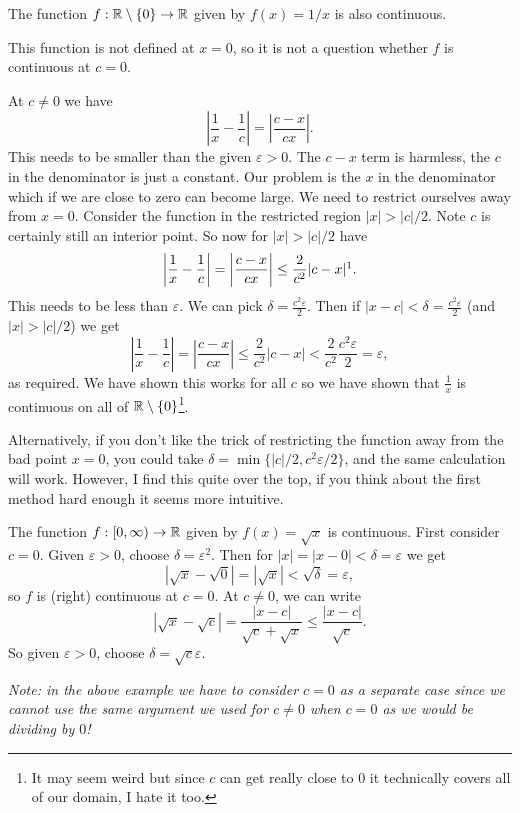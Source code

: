 \documentclass[10pt, a4paper]{article}
\begin{document}
\begin{example}
    The function $f : \mathbb{R} \setminus \{0\} \rightarrow \mathbb{R}$ given by $f(x) = 1 / x$ is also continuous.

    This function is not defined at $x = 0$,
    so it is not a question whether $f$ is continuous at $c = 0$.

    At $c \neq 0$ we have
    \[
    \left|\frac{1}{x} - \frac{1}{c}\right| = \left|\frac{c - x}{cx}\right|.
    \]
    This needs to be smaller than the given $\varepsilon > 0$.
    The $c - x$ term is harmless,
    the $c$ in the denominator is just a constant.
    Our problem is the $x$ in the denominator which if we are close to zero can become large.
    We need to restrict ourselves away from $x = 0$.
    Consider the function in the restricted region $|x| > |c| / 2$.
    Note $c$ is certainly still an interior point.
    So now for $|x| > |c| / 2$ have
    \[
    \left|\frac{1}{x} - \frac{1}{c}\right| = \left|\frac{c - x}{cx}\right| \leq \frac{2}{c ^ 2}|c - x|\footnotemark.
    \]
    This needs to be less than $\varepsilon$.
    We can pick $\delta = \frac{c ^ 2 \varepsilon}{2}$.
    Then if $|x - c| < \delta = \frac{c ^ 2 \varepsilon}{2}$
    (and $|x| > |c| / 2$)
    we get
    \[
    \left|\frac{1}{x} - \frac{1}{c}\right| = \left|\frac{c - x}{cx}\right| \leq \frac{2}{c ^ 2}|c - x| < \frac{2}{c ^ 2}\frac{c ^ 2\varepsilon}{2} = \varepsilon,
    \]
    as required.
    We have shown this works for all $c$ so we have shown that $\frac{1}{x}$ is continuous on all of $\mathbb{R} \setminus \{0\}$\footnote{It may seem weird but since $c$ can get really close to $0$ it technically covers all of our domain,
    I hate it too.}.

    Alternatively,
    if you don't like the trick of restricting the function away from the bad point $x = 0$,
    you could take $\delta = \min\{|c| / 2, c ^ 2\varepsilon / 2\}$,
    and the same calculation will work.
    However,
    I find this quite over the top,
    if you think about the first method hard enough it seems more intuitive.
\end{example}

\begin{example}
    The function $f : [0, \infty) \rightarrow \mathbb{R}$ given by $f(x) = \sqrt{x}$ is continuous.
    First consider $c = 0$.
    Given $\varepsilon > 0$,
    choose $\delta = \varepsilon ^ 2$.
    Then for $|x| = |x - 0| < \delta = \varepsilon$ we get
    \[
    |\sqrt{x} - \sqrt{0}| = |\sqrt{x}| < \sqrt{\delta} = \varepsilon,
    \]
    so $f$ is
    (right)
    continuous at $c = 0$.
    At $c \neq 0$,
    we can write
    \[
    |\sqrt{x} - \sqrt{c}| = \frac{|x - c|}{\sqrt{c} + \sqrt{x}} \leq \frac{|x - c|}{\sqrt{c}}.
    \]
    So given $\varepsilon > 0$,
    choose $\delta = \sqrt{c}\varepsilon$.
\end{example}
\textit{Note:
in the above example we have to consider $c = 0$ as a separate case since we cannot use the same argument we used for $c \neq 0$ when $c = 0$ as we would be dividing by $0$!}
\end{document}
